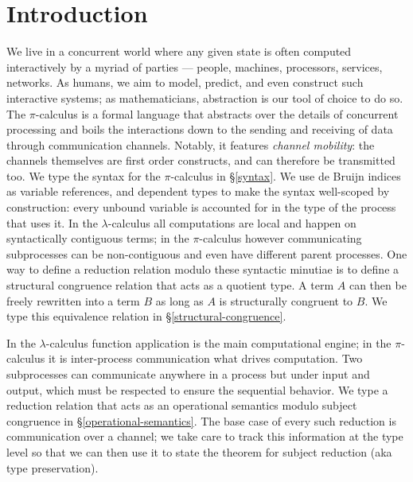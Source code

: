\documentclass[a4paper,UKenglish,cleveref, autoref, thm-restate,authorcolumns]{lipics-v2019}
\theoremstyle{definition}
\newcommand{\lambdacalc}{$\lambda$-calculus}
\newcommand{\picalc}{$\pi$-calculus}
\begin{document}
\section{Introduction}
We live in a concurrent world where any given state is often computed interactively by a myriad of parties --- people, machines, processors, services, networks.
As humans, we aim to model, predict, and even construct such interactive systems; as mathematicians, abstraction is our tool of choice to do so.
The \picalc{} \cite{} is a formal language that abstracts over the details of concurrent processing and boils the interactions down to the sending and receiving of data through communication channels.
Notably, it features \emph{channel mobility}: the channels themselves are first order constructs, and can therefore be transmitted too.
We type the syntax for the \picalc{} in \S \ref{syntax}.
We use de Bruijn indices \cite{} as variable references, and dependent types to make the syntax well-scoped by construction: every unbound variable is accounted for in the type of the process that uses it.
In the \lambdacalc{} all computations are local and happen on syntactically contiguous terms; in the \picalc{} however communicating subprocesses can be non-contiguous and even have different parent processes.
One way to define a reduction relation modulo these syntactic minutiae is to define a structural congruence \cite{} relation that acts as a quotient type.
A term $A$ can then be freely rewritten into a term $B$ as long as $A$ is structurally congruent to $B$.
We type this equivalence relation in \S \ref{structural-congruence}.

In the \lambdacalc{} function application is the main computational engine; in the \picalc{} it is inter-process communication what drives computation.
Two subprocesses can communicate anywhere in a process but under input and output, which must be respected to ensure the sequential behavior.
We type a reduction relation that acts as an operational semantics modulo subject congruence in \S \ref{operational-semantics}.
The base case of every such reduction is communication over a channel; we take care to track this information at the type level so that we can then use it to state the theorem for subject reduction (aka type preservation).
\end{document}

